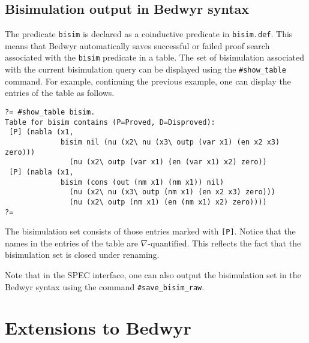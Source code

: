 \documentclass{article}
\newcommand\obj[1]{\texttt{#1}}
\begin{document}
\subsection{Bisimulation output in Bedwyr syntax}

The predicate \obj{bisim} is declared as a coinductive predicate in \obj{bisim.def}.
This means that Bedwyr automatically saves successful or failed proof search
associated with the \obj{bisim} predicate in a table. The set of bisimulation
associated with the current bisimulation query can be displayed using the
\obj{\#show\_table} command. For example, continuing the previous example,
one can display the entries of the table as follows. 

\begin{verbatim}
?= #show_table bisim.
Table for bisim contains (P=Proved, D=Disproved):
 [P] (nabla (x1,
             bisim nil (nu (x2\ nu (x3\ outp (var x1) (en x2 x3) zero)))
               (nu (x2\ outp (var x1) (en (var x1) x2) zero))
 [P] (nabla (x1,
             bisim (cons (out (nm x1) (nm x1)) nil)
               (nu (x2\ nu (x3\ outp (nm x1) (en x2 x3) zero)))
               (nu (x2\ outp (nm x1) (en (nm x1) x2) zero))))
?= 
\end{verbatim}
The bisimulation set consists of those entries marked with \obj{[P]}.
Notice that the names in the entries of the table are $\nabla$-quantified.
This reflects the fact that the bisimulation set is closed under
renaming. 

Note that in the SPEC interface, one can also output the bisimulation set
in the Bedwyr syntax using the command \obj{\#save\_bisim\_raw}.

\section{Extensions to Bedwyr}
\label{sec:bedwyr-ext}

\end{document}

